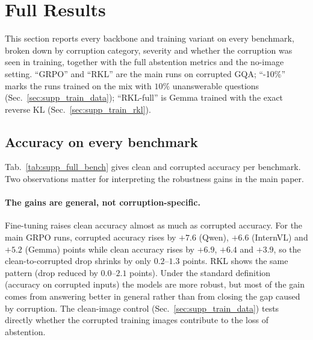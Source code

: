 \section{Full Results}
\label{sec:supp_full_results}

This section reports every backbone and training variant on every benchmark, broken down
by corruption category, severity and whether the corruption was seen in training, together
with the full abstention metrics and the no-image setting. ``GRPO'' and ``RKL'' are the main
runs on corrupted GQA; ``-10\%'' marks the runs trained on the mix with $10\%$
unanswerable questions (Sec.~\ref{sec:supp_train_data}); ``RKL-full'' is Gemma trained with
the exact reverse KL (Sec.~\ref{sec:supp_train_rkl}).

\subsection{Accuracy on every benchmark}
\label{sec:supp_full_bench}

Tab.~\ref{tab:supp_full_bench} gives clean and corrupted accuracy per benchmark. Two
observations matter for interpreting the robustness gains in the main paper.

\paragraph{The gains are general, not corruption-specific.}
Fine-tuning raises clean accuracy almost as much as corrupted accuracy. For the main GRPO
runs, corrupted accuracy rises by $+7.6$ (Qwen), $+6.6$ (InternVL) and $+5.2$ (Gemma)
points while clean accuracy rises by $+6.9$, $+6.4$ and $+3.9$, so the clean-to-corrupted
drop shrinks by only $0.2$--$1.3$ points. RKL shows the same pattern (drop reduced by
$0.0$--$2.1$ points). Under the standard definition (accuracy on corrupted inputs) the
models are more robust, but most of the gain comes from answering better in general rather
than from closing the gap caused by corruption. The clean-image control
(Sec.~\ref{sec:supp_train_data}) tests directly whether the corrupted training images
contribute to the loss of abstention.

